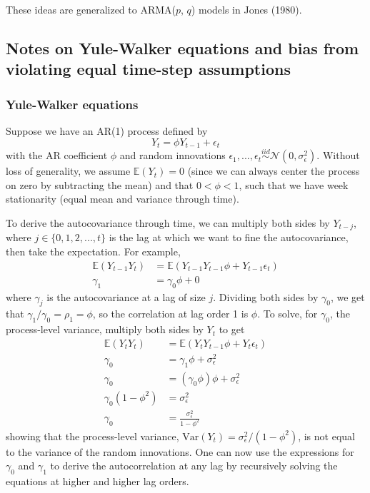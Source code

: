 These ideas are generalized to ARMA($p$, $q$) models in Jones (1980).



\subsection*{Notes on Yule-Walker equations and bias from violating equal time-step assumptions}

\subsubsection*{Yule-Walker equations}

Suppose we have an AR(1) process defined by
\begin{equation*}
    Y_t = \phi Y_{t-1} + \epsilon_t
\end{equation*}
with the AR coefficient $\phi$ and random innovations $\epsilon_1, ..., \epsilon_t \overset{iid}{\sim} \mathcal{N}(0, \sigma_\epsilon^2)$. Without loss of generality, we assume $\mathbb{E}(Y_t) = 0$ (since we can always center the process on zero by subtracting the mean) and that $0 < \phi < 1$, such that we have week stationarity (equal mean and variance through time).

To derive the autocovariance through time, we can multiply both sides by $Y_{t-j}$, where $j \in \{0,1,2,...,t\}$ is the lag at which we want to fine the autocovariance, then take the expectation. For example,
\begin{equation*}
    \begin{aligned}
        \mathbb{E}(Y_{t-1}Y_t) &= \mathbb{E}(Y_{t-1}Y_{t-1} \phi + Y_{t-1}\epsilon_t)\\
        \gamma_1 &= \gamma_0 \phi + 0
    \end{aligned}
\end{equation*}
where $\gamma_j$ is the autocovariance at a lag of size $j$. Dividing both sides by $\gamma_0$, we get that $\gamma_1/\gamma_0 = \rho_1 = \phi$, so the correlation at lag order 1 is $\phi$. To solve, for $\gamma_0$, the process-level variance, multiply both sides by $Y_t$ to get
\begin{equation*}
  \begin{aligned}
    \mathbb{E}(Y_t Y_t) &= \mathbb{E}(Y_t Y_{t-1} \phi + Y_t \epsilon_t)\\
    \gamma_0 &= \gamma_1 \phi + \sigma_\epsilon^2\\
    \gamma_0 &= (\gamma_0\phi)\phi + \sigma_\epsilon^2\\
    \gamma_0(1 - \phi^2) &= \sigma_\epsilon^2\\
    \gamma_0 &= \frac{\sigma_\epsilon^2}{1 - \phi^2}
  \end{aligned}
\end{equation*}
showing that the process-level variance, $\text{Var}(Y_t) = \sigma_\epsilon^2/(1 - \phi^2)$, is not equal to the variance of the random innovations. One can now use the expressions for $\gamma_0$ and $\gamma_1$ to derive the autocorrelation at any lag by recursively solving the equations at higher and higher lag orders.


